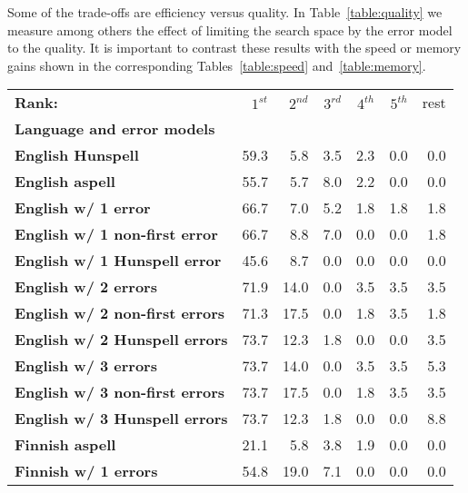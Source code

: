 \documentclass[a4paper,12pt]{article}
\begin{document}
Some of the trade-offs are efficiency versus quality. In
Table~\ref{table:quality} we measure among others the effect of limiting the
search space by the error model to the quality. It is important to contrast
these results with the speed or memory gains shown in the corresponding
Tables~\ref{table:speed} and~\ref{table:memory}.

\begin{table}
    \centering
    \begin{tabular}{|l|r|r|r|r|r|r|}
        \hline
        \bf Rank: & $1^{st}$ & $2^{nd}$ & $3^{rd}$ & $4^{th}$ & $5^{th}$ & rest \\
        \bf Language and error models &   &  &  &  &  &  \\
        \hline
        \bf English Hunspell & 59.3 & 5.8 & 3.5 & 2.3 & 0.0 & 0.0 \\
          \bf English aspell & 55.7 & 5.7 & 8.0 & 2.2 & 0.0 & 0.0 \\
        \hline
        \bf English w/ 1 error     & 66.7 & 7.0  & 5.2 & 1.8 & 1.8 & 1.8 \\
 \bf English w/ 1 non-first error  & 66.7 & 8.8  & 7.0 & 0.0 & 0.0 & 1.8 \\
 \bf English w/ 1 Hunspell error   & 45.6 & 8.7  & 0.0 & 0.0 & 0.0 & 0.0 \\
     \bf English w/ 2 errors       & 71.9 & 14.0 & 0.0 & 3.5 & 3.5 & 3.5 \\
 \bf English w/ 2 non-first errors & 71.3 & 17.5 & 0.0 & 1.8 & 3.5 & 1.8 \\
 \bf English w/ 2 Hunspell errors  & 73.7 & 12.3 & 1.8 & 0.0 & 0.0 & 3.5 \\
   \bf English w/ 3 errors         & 73.7 & 14.0 & 0.0 & 3.5 & 3.5 & 5.3 \\
 \bf English w/ 3 non-first errors & 73.7 & 17.5 & 0.0 & 1.8 & 3.5 & 3.5 \\
 \bf English w/ 3 Hunspell errors  & 73.7 & 12.3 & 1.8 & 0.0 & 0.0 & 8.8 \\
        \hline
       \bf Finnish aspell & 21.1 & 5.8 & 3.8 & 1.9 & 0.0 & 0.0 \\
        \bf Finnish w/ 1 errors & 54.8 & 19.0 & 7.1 & 0.0 & 0.0 & 0.0 \\

\end{tabular}
\end{table}
\end{document}
